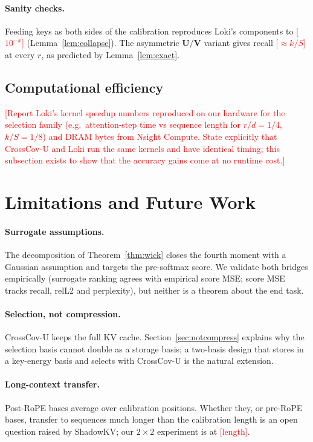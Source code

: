 \documentclass[10pt]{article}
\newcommand{\TODO}[1]{\textcolor{red}{[#1]}}
\newcommand{\bV}{\mathbf{V}}
\newcommand{\bU}{\mathbf{U}}
\newcommand{\method}{CrossCov-U}
\theoremstyle{plain}
\theoremstyle{definition}
\theoremstyle{remark}
\begin{document}
\paragraph{Sanity checks.}
Feeding keys as both sides of the calibration reproduces Loki's components
to \TODO{$10^{-x}$} (Lemma~\ref{lem:collapse}). The asymmetric $\bU/\bV$
variant gives recall \TODO{$\approx k/S$} at every $r$, as predicted by
Lemma~\ref{lem:exact}.

\subsection{Computational efficiency}

\TODO{Report Loki's kernel speedup numbers reproduced on our hardware for
the selection family (e.g.\ attention-step time vs sequence length for
$r/d=1/4$, $k/S=1/8$) and DRAM bytes from Nsight Compute. State explicitly
that \method{} and Loki run the same kernels and have identical timing; this
subsection exists to show that the accuracy gains come at no runtime cost.}

\section{Limitations and Future Work}
\label{sec:limits}

\paragraph{Surrogate assumptions.} The decomposition of
Theorem~\ref{thm:wick} closes the fourth moment with a Gaussian assumption
and targets the pre-softmax score. We validate both bridges empirically
(surrogate ranking agrees with empirical score MSE; score MSE tracks recall,
relL2 and perplexity), but neither is a theorem about the end task.

\paragraph{Selection, not compression.} \method{} keeps the full KV cache.
Section~\ref{sec:notcompress} explains why the selection basis cannot double
as a storage basis; a two-basis design that stores in a key-energy basis and
selects with \method{} is the natural extension.

\paragraph{Long-context transfer.} Post-RoPE bases average over calibration
positions. Whether they, or pre-RoPE bases, transfer to sequences much longer
than the calibration length is an open question raised by ShadowKV; our
$2\times2$ experiment is at \TODO{length}.
\end{document}
